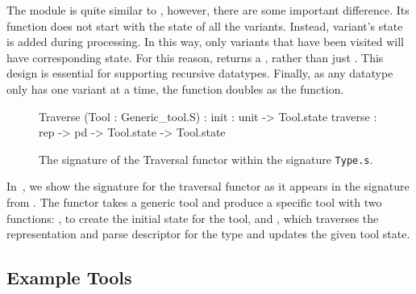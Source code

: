 The  module is quite similar to , however,
there are some important difference. Its  function does not
start with the state of all the variants. Instead, variant's state is
added during processing. In this way, only variants that have been
visited will have corresponding state. For this reason, 
returns a , rather than just . This design
is essential for supporting recursive datatypes. Finally, as any
datatype only has one variant at a time, the 
function doubles as the  function.

\begin{figure}
\begin{code}\scriptsize
   Traverse (Tool : Generic_tool.S) :
     init : unit -> Tool.state
     traverse : rep -> pd -> Tool.state -> Tool.state
\end{code}
\caption{The signature of the Traversal functor within the signature \texttt{Type.s}.}
\label{fig:traversal-interface}
\end{figure}

In~, we show the signature for the
traversal functor as it appears in the signature  from
. The functor takes a generic tool and produce
a specific tool with two functions: , to create the initial
state for the tool, and , which traverses the
representation and parse descriptor for the type and updates the given
tool state.

\subsection{Example Tools}
\label{sec:gentool-motivation-ex}


